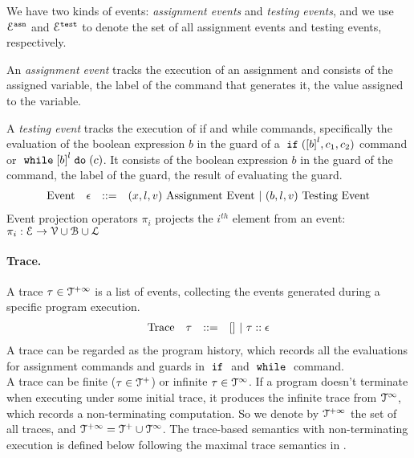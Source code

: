  We have two kinds of events: \emph{assignment events} and \emph{testing events},
 and we use $\mathcal{E}^{\mathtt{{asn}}}$ and $\mathcal{E}^{\mathtt{{test}}}$ to denote the set of all assignment events and testing events, respectively.

 An \emph{assignment event} tracks the execution of an assignment and consists of the assigned variable, the label of the command that generates it, the value assigned to the variable.

 A \emph{testing event} tracks the execution of if and while commands, specifically the evaluation of the boolean expression $b$ in the guard of a $\eif(\clabel{b}^l, c_1, c_2)$ command or $\ewhile \clabel{b}^l \edo (c)$.
 It consists of the boolean expression $b$ in the guard of the command, the label of the guard, the result of evaluating the guard.
%
\[
\begin{array}{llll}
  \mbox{Event} 
  & \mathtt{\epsilon} & ::= & 
  ({x}, l, v) ~ \mbox{Assignment Event} 
  ~|~(b, l, v) ~ \mbox{Testing Event}
\end{array}
\]
Event projection operators $\pi_i$ projects the $i^{th}$ element from an event: 
$\pi_i : \mathcal{E} \to \mathcal{V} \cup \mathcal{B} \cup \mathcal{L} $

\paragraph{Trace.}
%
A trace $\mathtt{\tau} \in \mathcal{T}^{+\infty}$ is a list of events, 
collecting the events generated during a specific program execution. 
\[
\begin{array}{llll}
\mbox{Trace} & \mathtt{\tau}
& ::= & [] ~|~ \mathtt{\tau} :: \mathtt{\epsilon} 
\end{array}
\]
A trace can be regarded as the program history, 
which records all the evaluations for assignment commands and guards in $\;\mathtt{if}\;$ and $\;\mathtt{while}\;$ command.
\\
{
A trace can be finite ($\mathtt{\tau} \in \mathcal{T}^{+}$) or infinite $\mathtt{\tau} \in \mathcal{T}^{\infty}$.
If a program doesn't terminate when executing under some initial trace,
it produces the infinite trace 
from $\mathcal{T}^{\infty}$, which records a non-terminating computation.
So we denote by $\mathcal{T}^{+\infty}$ the set of all traces, and $\mathcal{T}^{+\infty} = \mathcal{T}^{+} \cup \mathcal{T}^{\infty}$.
The trace-based semantics with non-terminating execution is defined below following the maximal trace semantics in \cite{Cousot19}.}

